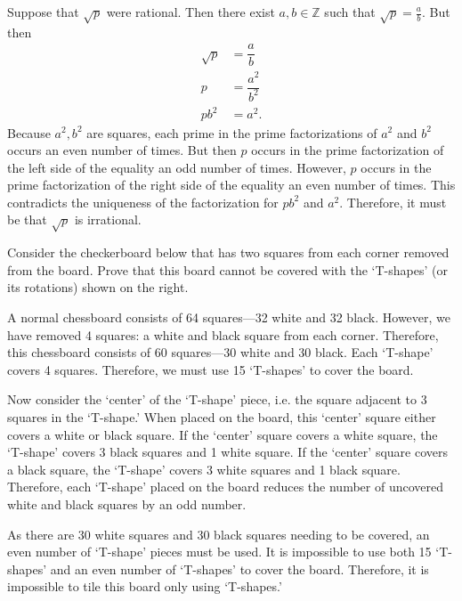 \documentclass[11pt,letterpaper]{article}
\begin{document}
Suppose that $\sqrt{p}$ were rational. Then there exist $a, b \in \mathbb{Z}$ such that $\sqrt{p}= \frac{a}{b}$. But then
	\[
	\begin{aligned}
	\sqrt{p}&= \dfrac{a}{b} \\
	p&= \dfrac{a^2}{b^2} \\
	pb^2&= a^2.
	\end{aligned}
	\]
Because $a^2, b^2$ are squares, each prime in the prime factorizations of $a^2$ and $b^2$ occurs an even number of times. But then $p$ occurs in the prime factorization of the left side of the equality an odd number of times. However, $p$ occurs in the prime factorization of the right side of the equality an even number of times. This contradicts the uniqueness of the factorization for $pb^2$ and $a^2$. Therefore, it must be that $\sqrt{p}$ is irrational. 

 



\newpage





 Consider the checkerboard below that has two squares from each corner removed from the board. Prove that this board cannot be covered with the `T-shapes' (or its rotations) shown on the right. \pspace

\drawboard

\sol A normal chessboard consists of 64 squares---32 white and 32 black. However, we have removed 4 squares: a white and black square from each corner. Therefore, this chessboard consists of 60 squares---30 white and 30 black. Each `T-shape' covers 4 squares. Therefore, we must use 15 `T-shapes' to cover the board. 

Now consider the `center' of the `T-shape' piece, i.e. the square adjacent to 3 squares in the `T-shape.' When placed on the board, this `center' square either covers a white or black square. If the `center' square covers a white square, the `T-shape' covers 3 black squares and 1 white square. If the `center' square covers a black square, the `T-shape' covers 3 white squares and 1 black square. Therefore, each `T-shape' placed on the board reduces the number of uncovered white and black squares by an odd number. 

As there are 30 white squares and 30 black squares needing to be covered, an even number of `T-shape' pieces must be used. It is impossible to use both 15 `T-shapes' and an even number of `T-shapes' to cover the board. Therefore, it is impossible to tile this board only using `T-shapes.' 

 
\end{document}

